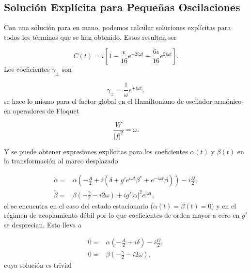\documentclass[10pt,a4paper]{report}
\begin{document}
\subsection{Solución Explícita para Pequeñas Oscilaciones }

Con una solución para  en mano, podemos calcular soluciones explícitas para todos los términos que se han obtenido. Estos resultan ser\cite{TesisMaestria}

\begin{equation}
C(t) = i [1 -\frac{\epsilon}{16}e^{-2i\omega t}-\frac{6\epsilon}{16}e^{2i\omega t}].
\end{equation} Los coeficientes $\gamma_{\pm}$ son

\begin{equation}
\gamma_\pm= \frac{1}{\omega}e^{\mp i\omega t},
\end{equation} se hace lo mismo para el factor global en el Hamiltoniano de oscilador armónico en operadores de Floquet

\begin{equation}
\frac{W}{|f|^2} = \omega.
\end{equation} 

Y se puede obtener expresiones explícitas para los coeficientes $\alpha(t)$ y $\beta(t)$ en la transformación al marco desplazado

\begin{align}
\dot{\alpha} =& \alpha(-\frac{A}{2}+i(\delta+g'e^{i\omega t} \beta^* + e^{-i\omega t} \beta))-i\frac{\Omega}{2},\\
\dot{\beta} =& \beta(-\frac{\gamma}{2}-i 2\omega)+ig'|\alpha|^2e^{i\omega t},
\end{align}
 el  se encuentra en
el caso del estado estacionario ($\dot{\alpha}(t)=\dot{\beta}(t)=0$) y
en el régimen de acoplamiento débil por lo que coeficientes de orden
mayor a cero en $g'$ se desprecian. Esto lleva a

\begin{align}
0 =& \alpha(-\frac{A}{2}+i\delta)-i\frac{\Omega}{2},\\
0 =& \beta(-\frac{\gamma}{2}-i 2\omega),
\end{align} cuya solución es trivial 
\end{document}
